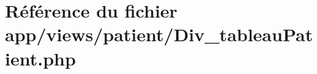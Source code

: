\hypertarget{_div__tableau_patient_8php}{}\section{Référence du fichier app/views/patient/\+Div\+\_\+tableau\+Patient.php}
\label{_div__tableau_patient_8php}

